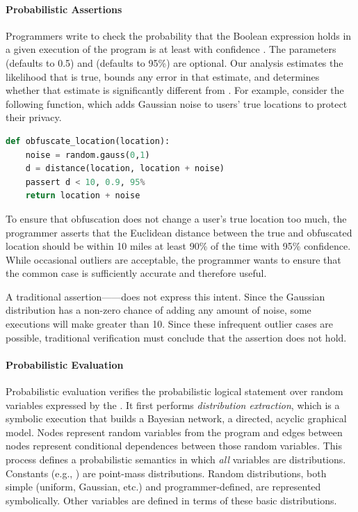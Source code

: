 \paragraph*{Probabilistic Assertions} 
Programmers write 
to check the probability that the Boolean expression  holds in
a given execution of the program is at least  with confidence
. The parameters  (defaults to 0.5) and 
(defaults to 95\%) are optional. Our analysis estimates the likelihood
that  is true, bounds any error in that estimate, and determines
whether that
estimate is significantly different from
. 
For example, consider the following function, which adds
Gaussian noise to users' true locations to protect their privacy.
%
\begin{lstlisting}[language=Python]
  def obfuscate_location(location):
    noise = random.gauss(0,1)
    d = distance(location, location + noise)
    passert d < 10, 0.9, 95%
    return location + noise
\end{lstlisting}
%
To ensure that obfuscation does not change a user's true location too
much, the programmer asserts that the Euclidean distance between the
true and obfuscated location should be within 10 miles at least 90\%
of the time with 95\% confidence. While occasional outliers are
acceptable, the programmer wants to ensure that the common case is
sufficiently accurate and therefore useful.

A traditional assertion------does not
express this intent.  Since the Gaussian distribution has a non-zero
chance of adding any amount of noise, some executions will make
 greater than 10.  Since these infrequent outlier cases are possible,
traditional verification must conclude that the assertion does not hold.

\paragraph*{Probabilistic Evaluation} Probabilistic evaluation
verifies the probabilistic logical statement over random variables
expressed by the \passert. It first performs \emph{distribution extraction},
which is a symbolic execution that builds a Bayesian
network, a directed, acyclic graphical model. Nodes
represent random variables from the program and edges between nodes
represent conditional dependences between those random variables.
This process defines a probabilistic semantics in which \emph{all}
variables are distributions. Constants (e.g., ) are
point-mass distributions.  Random distributions, both simple (uniform,
Gaussian, etc.) and programmer-defined, are represented
symbolically.  Other variables are defined in terms of these basic
distributions.

